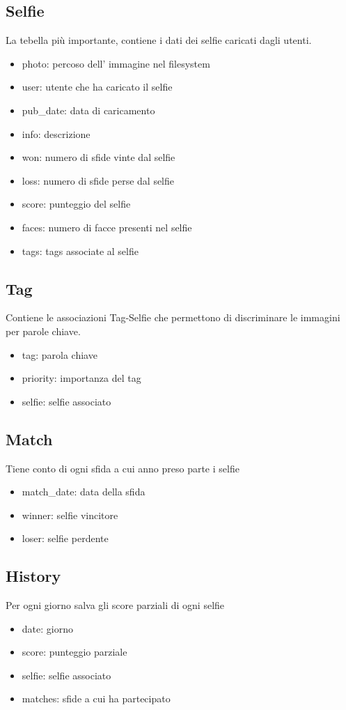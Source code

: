 \documentclass{article}
\begin{document}
\subsection{Selfie}
La tebella più importante, contiene i dati dei selfie caricati dagli utenti.
\begin{itemize}
\item photo: percoso dell' immagine nel filesystem
\item user: utente che ha caricato il selfie
\item pub\_date: data di caricamento
\item info: descrizione
\item won: numero di sfide vinte dal selfie
\item loss: numero di sfide perse dal selfie
\item score: punteggio del selfie
\item faces: numero di facce presenti nel selfie
\item tags: tags associate al selfie
\end{itemize}

\subsection{Tag}
Contiene le associazioni Tag-Selfie che permettono di discriminare le immagini per parole chiave.
\begin{itemize}
\item tag: parola chiave
\item priority: importanza del tag
\item selfie: selfie associato
\end{itemize}

\subsection{Match}
Tiene conto di ogni sfida a cui anno preso parte i selfie
\begin{itemize}
\item match\_date: data della sfida
\item winner: selfie vincitore
\item loser: selfie perdente
\end{itemize}

\subsection{History}
Per ogni giorno salva gli score parziali di ogni selfie
\begin{itemize}
\item date: giorno
\item score: punteggio parziale
\item selfie: selfie associato
\item matches: sfide a cui ha partecipato
\end{itemize}
\end{document}
